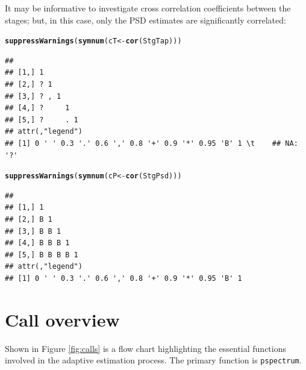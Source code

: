 \documentclass[10pt]{article}\usepackage[]{graphicx}\usepackage[]{color}
\makeatletter
\newcommand{\hlstd}[1]{\textcolor[rgb]{0.345,0.345,0.345}{#1}}%
\newcommand{\hlkwb}[1]{\textcolor[rgb]{0.69,0.353,0.396}{#1}}%
\newcommand{\hlkwd}[1]{\textcolor[rgb]{0.737,0.353,0.396}{\textbf{#1}}}%
\newenvironment{kframe}{%
 \def\at@end@of@kframe{}%
 \ifinner\ifhmode%
  \def\at@end@of@kframe{\end{minipage}}%
  \begin{minipage}{\columnwidth}%
 \fi\fi%
 \def\FrameCommand##1{\hskip\@totalleftmargin \hskip-\fboxsep
 \colorbox{shadecolor}{##1}\hskip-\fboxsep
     \hskip-\linewidth \hskip-\@totalleftmargin \hskip\columnwidth}%
 \MakeFramed {\advance\hsize-\width
   \@totalleftmargin\z@ \linewidth\hsize
   \@setminipage}}%
 {\par\unskip\endMakeFramed%
 \at@end@of@kframe}
\newenvironment{knitrout}{}{} %
\newcommand{\Rcmd}[1]{\texttt{#1}}
\makeatother
\begin{document}
It may be informative to investigate cross correlation
coefficients between the stages;
but, in this case, only the PSD estimates are significantly correlated:
\begin{knitrout}
\color{fgcolor}\begin{kframe}
\begin{alltt}
\hlkwd{suppressWarnings}\hlstd{(}\hlkwd{symnum}\hlstd{( cT} \hlkwb{<-} \hlkwd{cor}\hlstd{(StgTap) ))}
\end{alltt}
\begin{verbatim}
##               
## [1,] 1        
## [2,] ? 1      
## [3,] ? , 1    
## [4,] ?     1  
## [5,] ?     . 1
## attr(,"legend")
## [1] 0 ' ' 0.3 '.' 0.6 ',' 0.8 '+' 0.9 '*' 0.95 'B' 1 \t    ## NA: '?'
\end{verbatim}
\end{kframe}
\end{knitrout}
\begin{knitrout}
\color{fgcolor}\begin{kframe}
\begin{alltt}
\hlkwd{suppressWarnings}\hlstd{(}\hlkwd{symnum}\hlstd{( cP} \hlkwb{<-} \hlkwd{cor}\hlstd{(StgPsd) ))}
\end{alltt}
\begin{verbatim}
##               
## [1,] 1        
## [2,] B 1      
## [3,] B B 1    
## [4,] B B B 1  
## [5,] B B B B 1
## attr(,"legend")
## [1] 0 ' ' 0.3 '.' 0.6 ',' 0.8 '+' 0.9 '*' 0.95 'B' 1
\end{verbatim}
\end{kframe}
\end{knitrout}


\section{Call overview}

Shown
in Figure \ref{fig:calls}
is a flow chart 
highlighting the essential
functions involved in the adaptive estimation
process. The primary function is \Rcmd{pspectrum}.
\end{document}
